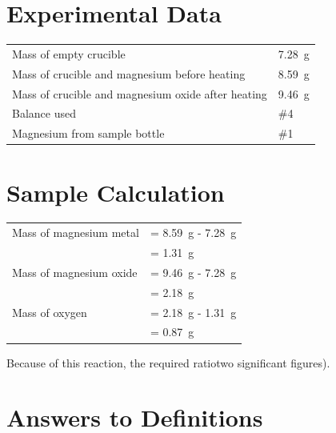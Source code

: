 \documentclass{article}
\begin{document}
\section{Experimental Data}

\begin{tabular}{ll}
Mass of empty crucible & \SI{7.28}{\gram}\\
Mass of crucible and magnesium before heating & \SI{8.59}{\gram}\\
Mass of crucible and magnesium oxide after heating & \SI{9.46}{\gram}\\
Balance used & \#4\\
Magnesium from sample bottle & \#1
\end{tabular}


\section{Sample Calculation}

\begin{tabular}{ll}
Mass of magnesium metal & = \SI{8.59}{\gram} - \SI{7.28}{\gram}\\
& = \SI{1.31}{\gram}\\
Mass of magnesium oxide & = \SI{9.46}{\gram} - \SI{7.28}{\gram}\\
& = \SI{2.18}{\gram}\\
Mass of oxygen & = \SI{2.18}{\gram} - \SI{1.31}{\gram}\\
& = \SI{0.87}{\gram}
\end{tabular}

Because of this reaction, the required ratiotwo significant figures).





\section{Answers to Definitions}
\end{document}
